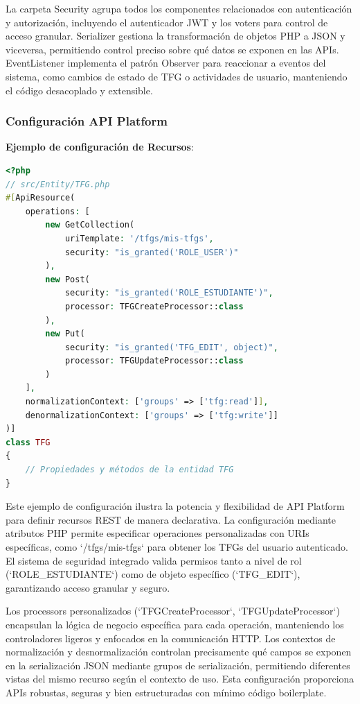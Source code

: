 \documentclass[12pt,a4paper,oneside]{report}
\begin{document}
La carpeta Security agrupa todos los componentes relacionados con autenticación y autorización, incluyendo el autenticador JWT y los voters para control de acceso granular. Serializer gestiona la transformación de objetos PHP a JSON y viceversa, permitiendo control preciso sobre qué datos se exponen en las APIs. EventListener implementa el patrón Observer para reaccionar a eventos del sistema, como cambios de estado de TFG o actividades de usuario, manteniendo el código desacoplado y extensible.

\subsubsection{Configuración API
Platform}\label{configuraciuxf3n-api-platform}

\textbf{Ejemplo de configuración de Recursos}:

\begin{lstlisting}[language=PHP]
<?php
// src/Entity/TFG.php
#[ApiResource(
    operations: [
        new GetCollection(
            uriTemplate: '/tfgs/mis-tfgs',
            security: "is_granted('ROLE_USER')"
        ),
        new Post(
            security: "is_granted('ROLE_ESTUDIANTE')",
            processor: TFGCreateProcessor::class
        ),
        new Put(
            security: "is_granted('TFG_EDIT', object)",
            processor: TFGUpdateProcessor::class
        )
    ],
    normalizationContext: ['groups' => ['tfg:read']],
    denormalizationContext: ['groups' => ['tfg:write']]
)]
class TFG
{
    // Propiedades y métodos de la entidad TFG
}
\end{lstlisting}

Este ejemplo de configuración ilustra la potencia y flexibilidad de API Platform para definir recursos REST de manera declarativa. La configuración mediante atributos PHP permite especificar operaciones personalizadas con URIs específicas, como `/tfgs/mis-tfgs` para obtener los TFGs del usuario autenticado. El sistema de seguridad integrado valida permisos tanto a nivel de rol (`ROLE\_ESTUDIANTE`) como de objeto específico (`TFG\_EDIT`), garantizando acceso granular y seguro.

Los processors personalizados (`TFGCreateProcessor`, `TFGUpdateProcessor`) encapsulan la lógica de negocio específica para cada operación, manteniendo los controladores ligeros y enfocados en la comunicación HTTP. Los contextos de normalización y desnormalización controlan precisamente qué campos se exponen en la serialización JSON mediante grupos de serialización, permitiendo diferentes vistas del mismo recurso según el contexto de uso. Esta configuración proporciona APIs robustas, seguras y bien estructuradas con mínimo código boilerplate.
\end{document}
